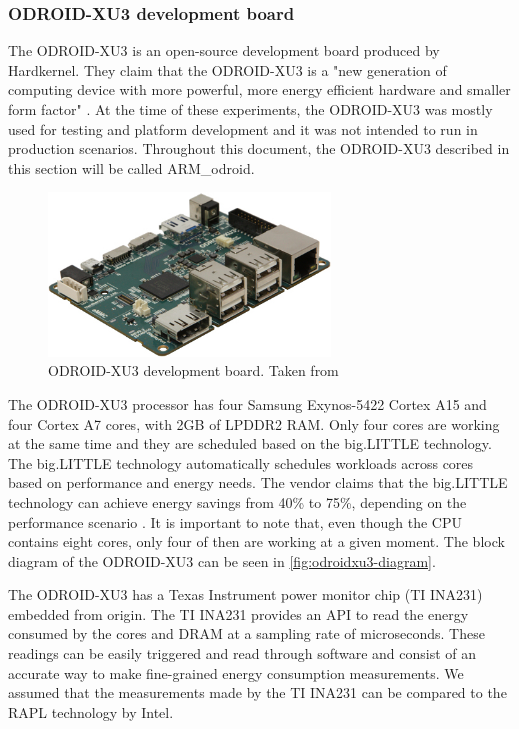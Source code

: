 \subsubsection*{ODROID-XU3 development board}

The ODROID-XU3 \cite{ODROID_XU3} is an open-source development board produced by
 Hardkernel. They claim that the ODROID-XU3 is a "new generation of computing device
with more powerful, more energy efficient hardware and smaller form factor"
\cite{ODROID_XU3}. At the time of these experiments, the ODROID-XU3 was  mostly used for testing and platform development and it was not intended to run in production scenarios. Throughout this document, the ODROID-XU3 described in this section will be called ARM\_odroid.


 \begin{figure}[h!]
  \centering
    \includegraphics[width=75mm]{"img/odroid"}
    \caption{ODROID-XU3 development board. Taken from \cite{ODROID_XU3}}
    \label{fig:odroid}
\end{figure}


The ODROID-XU3 processor has four Samsung Exynos-5422 Cortex A15 and four Cortex A7 cores,
with 2GB of LPDDR2 RAM. Only four cores are working at the same time and they are 
scheduled based on the big.LITTLE technology. The big.LITTLE technology
\cite{biglittle} automatically schedules workloads across cores based on
performance and energy needs. The vendor claims that the big.LITTLE technology
can achieve energy savings from 40\% to 
75\%, depending on the performance scenario \cite{biglittle}.
It is important to note that, even though the CPU contains eight cores, only four of then are working at a
given moment. The block diagram of the ODROID-XU3 can be seen in 
\ref{fig:odroidxu3-diagram}.


The ODROID-XU3 has a Texas Instrument power monitor chip (TI INA231) embedded
from origin. The TI INA231 provides an API to read the energy consumed by the 
cores and DRAM at a sampling rate of microseconds. These readings can be easily triggered and read
through software and consist of an accurate way to make fine-grained energy
consumption measurements. We assumed that the measurements made by the TI INA231 can 
be compared to the RAPL technology by Intel.


